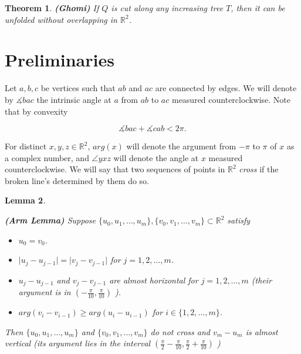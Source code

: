 \documentclass[openright, 12pt]{article}
\newtheorem{teorema}{Theorem}
\newtheorem{lema}[teorema]{Lemma}
\newcommand{\field}[1]{\ensuremath{\mathbb{#1}}}
\newcommand{\R}{\field{R}}
\begin{document}
\begin{teorema}\label{Gho}
{\rm \textbf{(Ghomi)} If $Q$ is cut along any increasing tree $T$, then it can be unfolded without overlapping in $\R ^2$.}
\end{teorema}


\section*{Preliminaries}



Let $a, b, c$ be vertices such that $ab $ and $ac$ are connected by edges. We will denote by $\measuredangle bac $ the intrinsic angle at $a $ from $ab$ to $ac$ measured counterclockwise. Note that by convexity

\begin{equation}\label{Alex}
\measuredangle bac + \measuredangle  cab  < 2\pi.
\end{equation} 

For distinct $x,y,z \in \R^2$, $arg (x)$ will denote the argument from $-\pi$ to $\pi$ of $x$ as a complex number, and $\angle yxz $ will denote the angle at $x$ measured counterclockwise. We will say that two sequences of points in $\R ^2$ \textit{cross} if the broken line's determined by them do so. 
 

\begin{lema} \label{Arm}
{\rm \textbf{(Arm Lemma)} Suppose $\{ u_0, u_1, \ldots , u_m     \}, \{ v_0, v_1, \ldots , v_m      \} \subset \R^2$ satisfy
\begin{itemize}
\item $u_0 = v_0$.
\item $\vert u_j - u_{j-1} \vert = \vert v_j - v_{j-1}  \vert$ for $j=1,2, \ldots, m$.
\item $u_{j }- u_{j-1} $ and $v_j - v_{j-1} $ are almost horizontal for $j = 1, 2, \ldots , m$ (their argument is in $\left( -\frac{\pi}{10},\frac{\pi}{10} \right)$ ).
\item $arg (v_{i} - v_{i-1} )\geq arg (u_{i} - u_{i-1})$ for $i \in \{ 1, 2, \ldots, m \} $.
\end{itemize}

Then $\{ u_0, u_1, \ldots , u_m     \}$ and $ \{ v_0, v_1, \ldots , v_m      \}$ do not cross and $v_m - u_m$ is almost vertical (its argument lies in the interval $\left(  \frac{\pi}{2} - \frac{\pi}{10} , \frac{\pi}{2} + \frac{\pi}{10}  \right)$ ) 
}
\end{lema}
\end{document}
